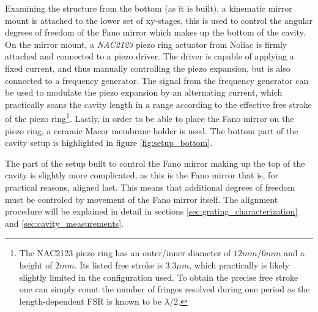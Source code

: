 Examining the structure from the bottom (as it is built), a kinematic mirror mount is attached to the lower set of xy-stages, this is used to control the angular degrees of freedom of the Fano mirror which makes up the bottom of the cavity. On the mirror mount, a \emph{NAC2123} piezo ring actuator from Noliac is firmly attached and connected to a piezo driver. The driver is capable of applying a fixed current, and thus manually controlling the piezo expansion, but is also connected to a frequency generator. The signal from the frequency generator can be used to modulate the piezo expansion by an alternating current, which practically scans the cavity length in a range according to the effective free stroke of the piezo ring\footnote{The NAC2123 piezo ring has an outer/inner diameter of $12mm/6mm$ and a height of $2mm$. Its listed free stroke is $3.3 \mu m$, which practically is likely slightly limited in the configuration used. To obtain the precise free stroke one can simply count the number of fringes resolved during one period as the length-dependent FSR is known to be $\lambda/2$.}. Lastly, in order to be able to place the Fano mirror on the  piezo ring, a ceramic Macor membrane holder is used. The bottom part of the cavity setup is highlighted in figure \ref{fig:setup_bottom}.

The part of the setup built to control the Fano mirror making up the top of the cavity is slightly more complicated, as this is the Fano mirror that is, for practical reasons, aligned last. This means that additional degrees of freedom must be controled by movement of the Fano mirror itself. The alignment procedure will be explained in detail in sections \ref{sec:grating_characterization} and \ref{sec:cavity_measurements}.

